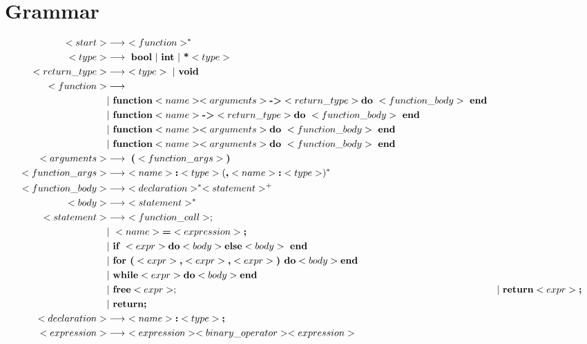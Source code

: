 \documentclass{article}
\begin{document}
\section{Grammar}
\begin{align*}
<start> &\longrightarrow \ <function>^* \\
<type> &\longrightarrow \ \textbf{bool} \ | \ \textbf{int} \ | \ \textbf{*} <type> \\
<return\_type> &\longrightarrow \ <type> \ | \ \textbf{void} \\
<function>  &\longrightarrow \\ 
    &| \ \textbf{function} <name> <arguments> \textbf{-\textgreater} <return\_type> \textbf{do} \ <function\_body> \ \textbf{end} \\
    &| \ \textbf{function} <name> \textbf{-\textgreater} <return\_type> \textbf{do} \ <function\_body> \ \textbf{end} 
    \\
    &| \ \textbf{function} <name> <arguments> \textbf{do} \ <function\_body> \ \textbf{end} \\
    &| \ \textbf{function} <name> <arguments> \textbf{do} \ <function\_body> \ \textbf{end} \\
<arguments> &\longrightarrow \ \textbf{(} <function\_args>\textbf{)} \\
<function\_args> &\longrightarrow \ <name> \textbf{:} <type> (\textbf{,} <name> \textbf{:} <type>)^* \\
<function\_body> &\longrightarrow \ <declaration>^* <statement>^+ \\
<body> &\longrightarrow \ <statement>^* \\
<statement> &\longrightarrow \ <function\_call>; \\
    &| \ <name> \textbf{=} <expression> \textbf{;}\\ 
    &| \ \textbf{if } <expr> \textbf{do} <body> \textbf{else} <body>  \ \textbf{end} \\
    &| \ \textbf{for (} <expr> \textbf{,} <expr> \textbf{,} <expr> \textbf{) do} <body> \textbf{end} \\ 
    &| \ \textbf{while} <expr> \textbf{do} <body> \textbf{end} \\
    &| \ \textbf{free} <expr>;
    &| \ \textbf{return} <expr> \textbf{;} \\
    &| \ \textbf{return;} \\
<declaration>  &\longrightarrow \ <name> \textbf{:} <type> \textbf{;} \\
<expression> &\longrightarrow \ <expression> <binary\_operator> <expression> \\

\end{align*}
\end{document}
